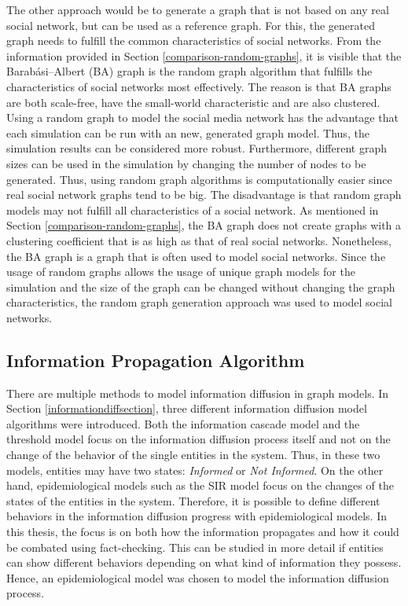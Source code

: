 The other approach would be to generate a graph that is not based
on any real social network, but can be used as a reference graph.
For this, the generated graph needs to fulfill the common
characteristics of social networks.
From the information provided in Section \ref{comparison-random-graphs}, 
it is visible that the Barabási–Albert (BA) graph is the random graph 
algorithm that fulfills the characteristics of social networks most effectively.
The reason is that BA graphs are both scale-free, have the small-world
characteristic and are also clustered.
Using a random graph to model the social media network has the advantage
that each simulation can be run with an new, generated graph model. 
Thus, the simulation results can be considered more robust. 
Furthermore, different graph sizes can be 
used in the simulation by changing the number of nodes to be generated.
Thus, using random graph algorithms is computationally easier since 
real social network graphs tend to be big.
The disadvantage is that random graph models may not fulfill
all characteristics of a social network. As mentioned in 
Section \ref{comparison-random-graphs}, the BA graph
does not create graphs with a clustering coefficient that is as 
high as that of real social networks. Nonetheless, the BA graph is
a graph that is often used to model social networks.
Since the usage of random graphs allows the usage
of unique graph models for the simulation and the size of the 
graph can be changed without changing the graph characteristics, 
the random graph generation approach was used to model social networks.

\subsection{Information Propagation Algorithm}
\label{modelinformationdiffusion}

There are multiple methods to model information diffusion in graph models.
In Section \ref{informationdiffsection}, three different information diffusion
model algorithms were introduced.
Both the information cascade model and the threshold model focus on the 
information diffusion process itself and not on the change of the behavior
of the single entities in the system. Thus, in these two models,
entities may have two states: 
\textit{Informed} or \textit{Not Informed}.
On the other hand, epidemiological models such as the SIR model
focus on the changes of the states of the entities in the system.
Therefore, it is possible to define different behaviors in the
information diffusion progress with epidemiological models. 
In this thesis, the focus is on both how the information
propagates and how it could be combated using fact-checking.
This can be studied in more detail if entities can 
show different behaviors depending on what kind of information
they possess. Hence, an epidemiological model was chosen 
to model the information diffusion process.

